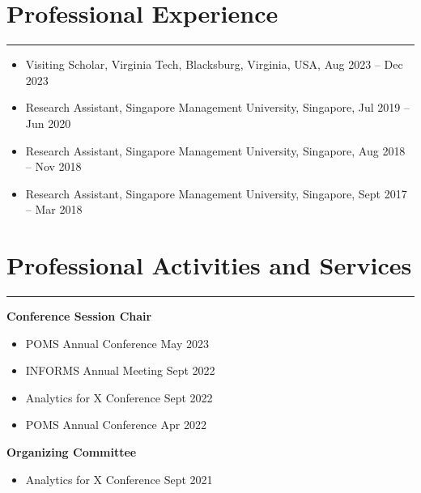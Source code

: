 \documentclass[12pt, a4paper]{article}
\begin{document}
{\section*{Professional Experience}
\vspace*{0.4em}
\hrule height 0.5pt

\begin{itemize}[leftmargin=26pt, itemsep=0pt, parsep=0.2pt, topsep=1pt]
    \item Visiting Scholar, Virginia Tech, Blacksburg, Virginia, USA, Aug 2023 -- Dec 2023	
    \item Research Assistant, Singapore Management University, Singapore, Jul 2019 -- Jun 2020
	\item Research Assistant, Singapore Management University, Singapore, Aug 2018 -- Nov 2018
    \item Research Assistant, Singapore Management University, Singapore, Sept 2017 -- Mar 2018
\end{itemize}




\section*{Professional Activities and Services}
\vspace*{0.4em}
\hrule height 0.5pt

\raggedright\textbf{Conference Session Chair}

\begin{itemize}[leftmargin=26pt, itemsep=2pt, parsep=0pt, topsep=-0.5em]
	\item POMS Annual Conference \hfill May 2023
	\item INFORMS Annual Meeting \hfill Sept 2022
	\item Analytics for X Conference \hfill Sept 2022
	\item POMS Annual Conference \hfill Apr 2022
\end{itemize}



\raggedright\textbf{Organizing Committee}

\begin{itemize}[leftmargin=26pt, itemsep=2pt, parsep=0pt, topsep=-0.5em]
	\item Analytics for X Conference \hfill Sept 2021
\end{itemize}



}
\end{document}
